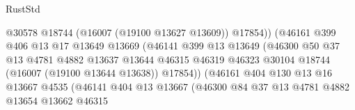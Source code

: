 \begin{lexlean}{RustStd}
\begin{coremodule}
                                            @30578
                                            @18744
                                            (@16007 (@19100 @13627 @13609))
                                            @17854))
                                        (@46161
                                          @399
                                          @406
                                          @13
                                          @17
                                          @13649
                                          @13669
                                          (@46141
                                            @399
                                            @13
                                            @13649
                                            (@46300
                                              @50
                                              @37
                                              @13
                                              @4781
                                              @4882
                                              @13637
                                              @13644
                                              @46315
                                              @46319
                                              @46323
                                              @30104
                                              @18744
                                              (@16007 (@19100 @13644 @13638))
                                              @17854))
                                          (@46161
                                            @404
                                            @130
                                            @13
                                            @16
                                            @13667
                                            @4535
                                            (@46141
                                              @404
                                              @13
                                              @13667
                                              (@46300
                                                @84
                                                @37
                                                @13
                                                @4781
                                                @4882
                                                @13654
                                                @13662
                                                @46315

\end{coremodule}
\end{lexlean}
